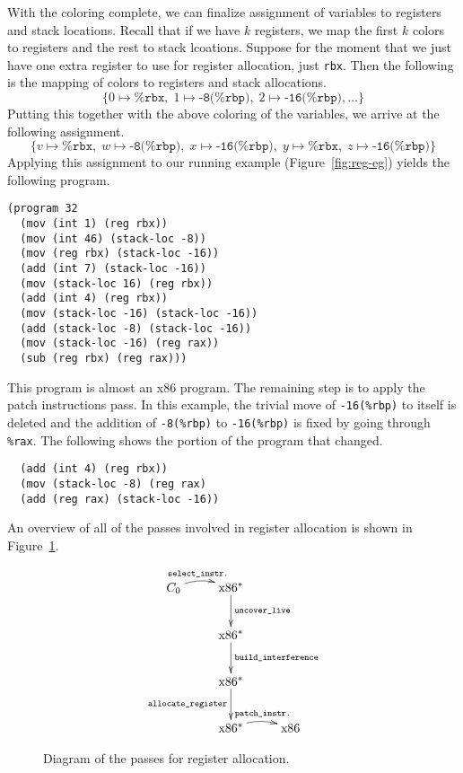 \documentclass[12pt]{book}
\newcommand{\key}[1]{\texttt{#1}}
\begin{document}
With the coloring complete, we can finalize assignment of variables to
registers and stack locations. Recall that if we have $k$ registers,
we map the first $k$ colors to registers and the rest to stack
lcoations. Suppose for the moment that we just have one extra register
to use for register allocation, just \key{rbx}. Then the following is
the mapping of colors to registers and stack allocations.
\[
  \{ 0 \mapsto \key{\%rbx}, \; 1 \mapsto \key{-8(\%rbp)}, \; 2 \mapsto \key{-16(\%rbp)}, \ldots \}
\]
Putting this together with the above coloring of the variables, we
arrive at the following assignment.
\[
  \{ v \mapsto \key{\%rbx}, \;
  w \mapsto \key{-8(\%rbp)},  \;
  x \mapsto \key{-16(\%rbp)}, \;
  y \mapsto \key{\%rbx},  \;
  z\mapsto \key{-16(\%rbp)} \}
\]
Applying this assignment to our running example
(Figure~\ref{fig:reg-eg}) yields the following program.
\begin{lstlisting}
(program 32
  (mov (int 1) (reg rbx))
  (mov (int 46) (stack-loc -8))
  (mov (reg rbx) (stack-loc -16))
  (add (int 7) (stack-loc -16))
  (mov (stack-loc 16) (reg rbx))
  (add (int 4) (reg rbx))
  (mov (stack-loc -16) (stack-loc -16))
  (add (stack-loc -8) (stack-loc -16))
  (mov (stack-loc -16) (reg rax))
  (sub (reg rbx) (reg rax)))
\end{lstlisting}
This program is almost an x86 program. The remaining step is to apply
the patch instructions pass. In this example, the trivial move of
\key{-16(\%rbp)} to itself is deleted and the addition of
\key{-8(\%rbp)} to \key{-16(\%rbp)} is fixed by going through
\key{\%rax}. The following shows the portion of the program that
changed.
\begin{lstlisting}
  (add (int 4) (reg rbx))
  (mov (stack-loc -8) (reg rax)
  (add (reg rax) (stack-loc -16))
\end{lstlisting}
An overview of all of the passes involved in register allocation is
shown in Figure~\ref{fig:reg-alloc-passes}.

\begin{figure}[tbp]
\[
\xymatrix{
  C_0 \ar@/^/[r]^-{\key{select\_instr.}}
    & \text{x86}^{*} \ar[d]^-{\key{uncover\_live}} \\
    & \text{x86}^{*} \ar[d]^-{\key{build\_interference}} \\
    & \text{x86}^{*} \ar[d]_-{\key{allocate\_register}} \\
    & \text{x86}^{*} \ar@/^/[r]^-{\key{patch\_instr.}} 
    & \text{x86} 
}
\]
\caption{Diagram of the passes for register allocation.}
\label{fig:reg-alloc-passes}
\end{figure}
\end{document}
